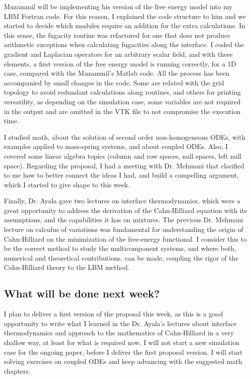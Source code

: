 \documentclass[12pt]{article}
\begin{document}
	Muzammil will be implementing his version of the free energy model into my LBM Fortran code. For this reason, I explained the code structure to him and we started to decide which modules require an addition for the extra calculations. In this sense, the fugacity routine was refactored for one that does not produce arithmetic exceptions when calculating fugacities along the interface. I coded the gradient and Laplacian operators for an arbitrary scalar field, and with these elements, a first version of the free energy model is running correctly, for a 1D case, compared with the Muzammil's Matlab code. All the process has been accompanied by small changes in the code. Some are related with the grid topology to avoid redundant calculations along routines, and others for printing versatility, as depending on the simulation case, some variables are not required in the output and are omitted in the VTK file to not compromise the execution time.
	
	I studied math, about the solution of second order non-homogeneous ODEs, with examples applied to mass-spring systems, and about coupled ODEs. Also, I covered some linear algebra topics (column and row spaces, null spaces, left null space). Regarding the proposal, I had a meeting with Dr. Mehmani that clarified to me how to better connect the ideas I had, and build a compelling argument, which I started to give shape to this week. 
	
	Finally, Dr. Ayala gave two lectures on interface thermodynamics, which were a great opportunity to address the derivation of the Cahn-Hilliard equation with its assumptions, and the capabilities it has on mixtures. The previous Dr. Mehmani lecture on calculus of variations was fundamental for understanding the origin of Cahn-Hilliard on the minimization of the free-energy functional. I consider this to be the correct method to study the multicomponent systems, and where both, numerical and theoretical contributions, can be made, coupling the rigor of the Cahn-Hilliard theory to the LBM method. 
	  
	
	\subsection*{What will be done next week?}
	I plan to deliver a first version of the proposal this week, as this is a good opportunity to write what I learned in the Dr. Ayala's lectures about interface thermodynamics and approach to the mathematics of Cahn-Hilliard in a very shallow way, at least for what is required now. I will not start a new simulation case for the ongoing paper, before I deliver the first proposal version. I will start solving exercises on coupled ODEs and keep advancing with the suggested math chapters. 
	
\end{document}
